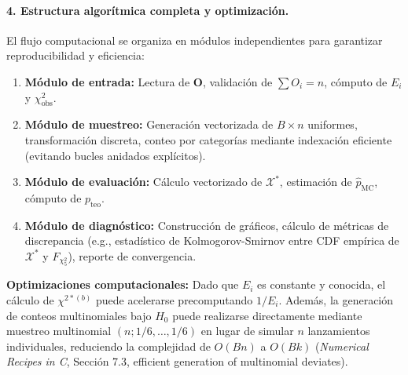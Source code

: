 \documentclass[12pt]{article}
\begin{document}
\paragraph{4. Estructura algorítmica completa y optimización.}
El flujo computacional se organiza en módulos independientes para garantizar reproducibilidad y eficiencia:
\begin{enumerate}
    \item \textbf{Módulo de entrada:} Lectura de $\mathbf{O}$, validación de $\sum O_i = n$, cómputo de $E_i$ y $\chi^2_{\text{obs}}$.
    \item \textbf{Módulo de muestreo:} Generación vectorizada de $B \times n$ uniformes, transformación discreta, conteo por categorías mediante indexación eficiente (evitando bucles anidados explícitos).
    \item \textbf{Módulo de evaluación:} Cálculo vectorizado de $\mathcal{X}^*$, estimación de $\hat{p}_{\text{MC}}$, cómputo de $p_{\text{teo}}$.
    \item \textbf{Módulo de diagnóstico:} Construcción de gráficos, cálculo de métricas de discrepancia (e.g., estadístico de Kolmogorov-Smirnov entre CDF empírica de $\mathcal{X}^*$ y $F_{\chi^2_5}$), reporte de convergencia.
\end{enumerate}
\textbf{Optimizaciones computacionales:} Dado que $E_i$ es constante y conocida, el cálculo de $\chi^{2*(b)}$ puede acelerarse precomputando $1/E_i$. Además, la generación de conteos multinomiales bajo $H_0$ puede realizarse directamente mediante muestreo multinomial $(n; 1/6, \dots, 1/6)$ en lugar de simular $n$ lanzamientos individuales, reduciendo la complejidad de $O(Bn)$ a $O(Bk)$ (\textit{Numerical Recipes in C}, Sección 7.3, efficient generation of multinomial deviates).
\end{document}
